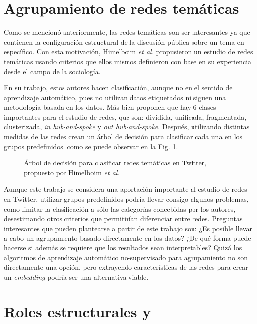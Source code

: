 \section{Agrupamiento de redes temáticas}

Como se mencionó anteriormente, las redes temáticas son ser interesantes ya que contienen la configuración estructural de la discusión pública sobre un tema en específico. Con esta motivación, Himelboim \textit{et al.} propusieron un estudio de redes temáticas usando criterios que ellos mismos definieron con base en su experiencia desde el campo de la sociología. 

En su trabajo, estos autores hacen clasificación, aunque no en el sentido de aprendizaje automático, pues no utilizan datos etiquetados ni siguen una metodología basada en los datos. Más bien proponen que hay 6 clases importantes para el estudio de redes, que son: dividida, unificada, fragmentada, clusterizada, \textit{in hub-and-spoke} y \textit{out hub-and-spoke}. Después, utilizando distintas medidas de las redes crean un árbol de decisión para clasificar cada una en los grupos predefinidos, como se puede observar en la Fig. \ref{fig:himelboim}.

 \begin{figure}[htbp]
   \centering
   
    \caption{Árbol de decisión para clasificar redes temáticas en Twitter, propuesto por Himelboim \textit{ et al.} \cite{himelboim_classifying_2017}} %
    \label{fig:himelboim}
\end{figure}

Aunque este trabajo se considera una aportación importante al estudio de redes en Twitter, utilizar grupos predefinidos podría llevar consigo algunos problemas, como limitar la clasificación a sólo las categorías concebidas por los autores, desestimando otros criterios que permitirían diferenciar entre redes. Preguntas interesantes que pueden plantearse a partir de este trabajo son: ¿Es posible llevar a cabo un agrupamiento basado directamente en los datos? ¿De qué forma puede hacerse si además se requiere que los resultados sean interpretables? Quizá los algoritmos de aprendizaje automático no-supervisado para agrupamiento no son directamente una opción, pero extrayendo características de las redes para crear un \textit{embedding} podría ser una alternativa viable.

\section{Roles estructurales y \graphlets}

